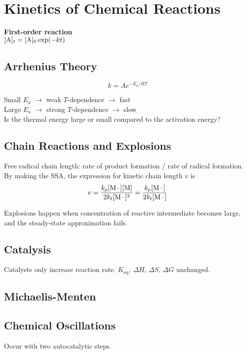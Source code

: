 \section{Kinetics of Chemical Reactions}

\textbf{First-order reaction} \\
 $[\ce{A}]_t = [\ce{A}]_0 \exp (-kt)$
\vspace{\baselineskip}

\subsection*{Arrhenius Theory}

\begin{equation*}
    k = Ae^{-E_a/RT}
\end{equation*}

Small $E_a$ $\rightarrow$ weak $T$-dependence $\rightarrow$ fast \\
Large $E_a$ $\rightarrow$ strong $T$-dependence $\rightarrow$ slow \\
Is the thermal energy large or small compared to the activation energy?

\subsection*{Chain Reactions and Explosions}
Free radical chain length: rate of product formation / rate of radical formation. By making the SSA, the expression for kinetic chain length $v$ is
\begin{equation*}
    v = \frac{k_p [\ce{M.}][\ce{M}]}{2k_t[\ce{M.}]^2} = \frac{k_p[\ce{M.}]}{2k_t[\ce{M.}]}
\end{equation*}

Explosions happen when concentration of reactive intermediate becomes large, and the
steady-state approximation fails.

\subsection*{Catalysis}
Catalysts only increase reaction rate. $K_{\mathrm{eq}}$, $\Delta H$, $\Delta S$, $\Delta G$ unchanged.

\subsection*{Michaelis-Menten}

\subsection*{Chemical Oscillations}
Occur with two autocatalytic steps.
